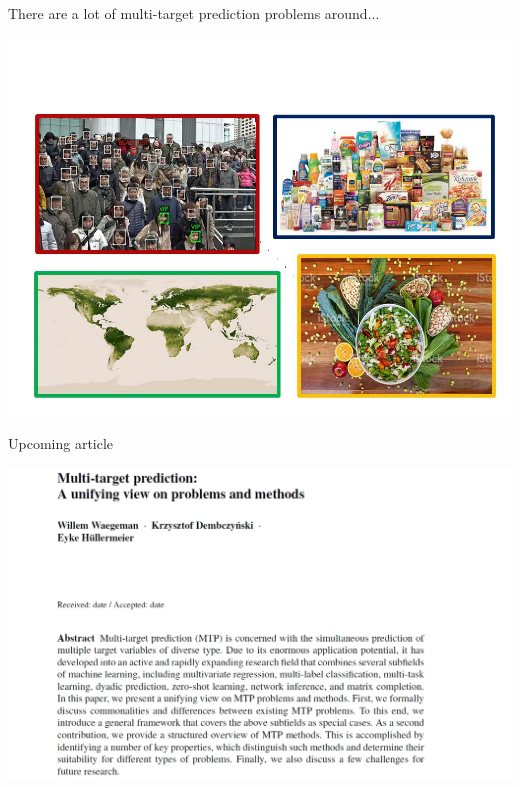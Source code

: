 \documentclass[]{beamer}
\begin{document}
\begin{frame}{There are a lot of multi-target prediction problems around...}

\begin{center}
\includegraphics[width=\textwidth,trim = 0 0 0 70,clip]{Figures/pictures/Slide20}
\end{center}

\end{frame}

\begin{frame}{Upcoming article}

\begin{center}
\includegraphics[width=\textwidth,trim = 0 0 0 0,clip]{Figures/dami}
\end{center}

\end{frame}
\end{document}

